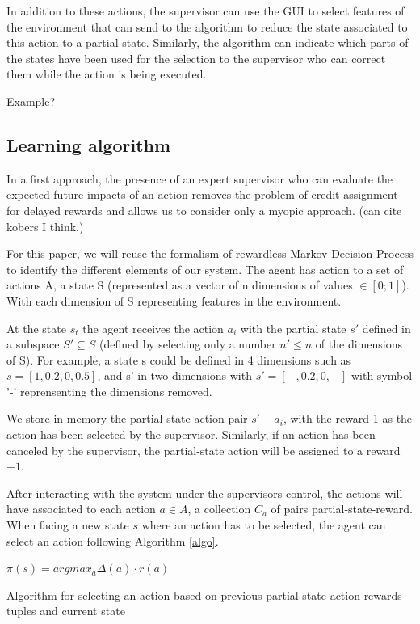 \documentclass[letterpaper]{article} %
\begin{document}
In addition to these actions, the supervisor can use the GUI to select features
of the environment that can send to the algorithm to reduce the state associated
to this action to a partial-state. Similarly, the algorithm can indicate which
parts of the states have been used for the selection to the supervisor who can
correct them while the action is being executed.

Example?

\subsection{Learning algorithm}

In a first approach, the presence of an expert supervisor who can evaluate the
expected future impacts of an action removes the problem of credit assignment
for delayed rewards and allows us to consider only a myopic approach. (can cite
kobers I think.)

For this paper, we will reuse the formalism of rewardless Markov Decision 
Process to identify the different elements of our system. The agent has action
to a set of actions A, a state S (represented as a vector of n dimensions of
values $\in [0;1]$). With each dimension of S representing features in the
environment.

At the state $s_{t}$ the agent receives the action $a_{i}$ with the partial
state $s'$ defined in a subspace $S' \subseteq S$ (defined by selecting only a
number $n' \leq n$ of the dimensions of S). For example, a state s could be
defined in 4 dimensions such as $s=[1,0.2,0,0.5]$, and s' in two dimensions with
$s'=[-,0.2,0,-]$ with symbol '-' reprensenting the dimensions removed.

We store in memory the partial-state action pair $s'-a_{i}$, with the reward 1
as the action has been selected by the supervisor. Similarly, if an action has
been canceled by the supervisor, the partial-state action will be assigned to a
reward $-1$.

After interacting with the system under the supervisors control, the actions
will have associated to each action $a \in A$, a collection $C_{a}$ of pairs
partial-state-reward. When facing a new state $s$ where an action has to be
selected, the agent can select an action following Algorithm \ref{algo}.

\begin{algorithm}
    \DontPrintSemicolon
    $\pi(s) = argmax_{a}\Delta(a) \cdot r(a)$

    \caption{Algorithm for selecting an action based on previous
    partial-state action rewards tuples and current state}
    \label{algo}
\end{algorithm}
\end{document}
